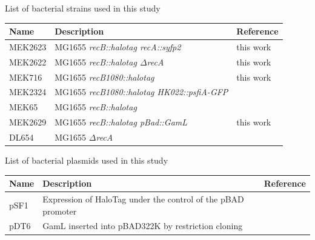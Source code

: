 \clearpage

\setlength\intextsep{40pt}


\begin{supptable}[htbp]
    \centering
    \caption{List of bacterial strains used in this study}
    \begin{tabular}{lll}
        \toprule
        Name & Description & Reference\\
        \midrule
        MEK2623 & MG1655 \textit{recB::halotag recA::syfp2} & this work\\
        MEK2622 & MG1655 \textit{recB::halotag $\Delta$recA} & this work \\ %
        MEK716 & MG1655 \textit{recB1080::halotag} & this work \\ %
        MEK2324 & MG1655 \textit{recB1080::halotag HK022::psfiA-GFP} & \cite{Lepore2023} \\
        MEK65 & MG1655 \textit{recB::halotag} & \cite{Lepore2019a} \\
        MEK2629 & MG1655 \textit{recB::halotag pBad::GamL} & this work \\ %
        DL654 & MG1655 \textit{$\Delta$recA} & \cite{Wertman1986} \\
        \bottomrule
    \end{tabular}
    \label{SItab:strains}
\end{supptable}

\begin{supptable}[htbp]
    \centering
    \caption{List of bacterial plasmids used in this study}
    \begin{tabular}{lll}
        \toprule
        Name & Description & Reference\\
        \midrule
        pSF1 & Expression of HaloTag under the control of the pBAD promoter & \cite{Lepore2019a} \\
        pDT6 & GamL inserted into pBAD322K by restriction cloning & \cite{Wilkinson2016} \\
        \bottomrule
    \end{tabular}
    \label{SItab:plasmids}
\end{supptable}

